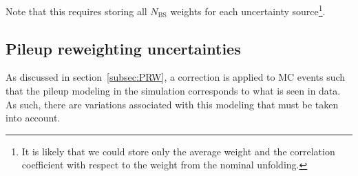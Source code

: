 

Note that this requires storing all $N_\mathrm{BS}$ weights for each uncertainty source\footnote{It is likely that we could store only the average weight and the correlation coefficient with respect to the weight from the nominal unfolding.}.


\subsection{Pileup reweighting uncertainties}
As discussed in section~\ref{subsec:PRW}, a correction is applied to MC events such that the pileup modeling in the simulation corresponds to what is seen in data. As such, there are variations associated with this modeling
that must be taken into account.

